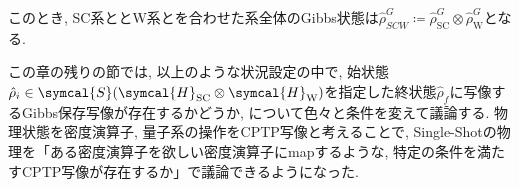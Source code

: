 このとき, SC系ととW系とを合わせた系全体のGibbs状態は$\hat{\rho}_{SCW}^G\coloneqq\hat{\rho}_{\text{SC}}^G\otimes\hat{\rho}_{\text{W}}^G$となる. 

この章の残りの節では, 以上のような状況設定の中で, 始状態$\hat{\rho}_i\in\symcal{S}(\symcal{H}_{\text{SC}}\otimes\symcal{H}_{\text{W}})$を指定した終状態$\hat{\rho}_{f}$に写像するGibbs保存写像が存在するかどうか, について色々と条件を変えて議論する. 
物理状態を密度演算子, 量子系の操作をCPTP写像と考えることで, Single-Shotの物理を「ある密度演算子を欲しい密度演算子にmapするような, 特定の条件を満たすCPTP写像が存在するか」で議論できるようになった. 


